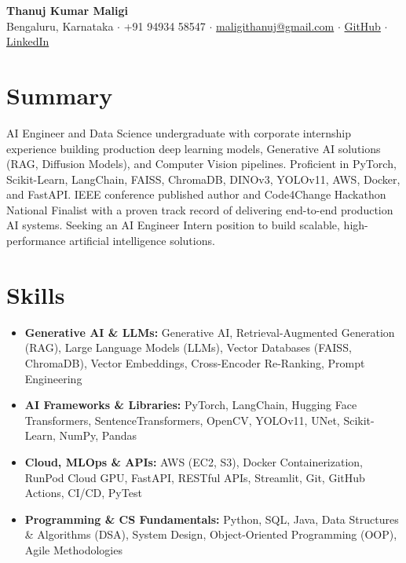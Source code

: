 \documentclass[a4paper,10pt]{article}
\begin{document}

\begin{center}
{\LARGE \textbf{Thanuj Kumar Maligi}}\\[1pt]
Bengaluru, Karnataka $\cdot$ +91 94934 58547 $\cdot$ \href{mailto:maligithanuj@gmail.com}{maligithanuj@gmail.com} $\cdot$ \href{https://github.com/ThanujMaligi}{GitHub} $\cdot$ \href{https://www.linkedin.com/in/thanuj-kumar-maligi-8882b2288}{LinkedIn}
\end{center}


\section*{Summary}
AI Engineer and Data Science undergraduate with corporate internship experience building production deep learning models, Generative AI solutions (RAG, Diffusion Models), and Computer Vision pipelines. Proficient in PyTorch, Scikit-Learn, LangChain, FAISS, ChromaDB, DINOv3, YOLOv11, AWS, Docker, and FastAPI. IEEE conference published author and Code4Change Hackathon National Finalist with a proven track record of delivering end-to-end production AI systems. Seeking an AI Engineer Intern position to build scalable, high-performance artificial intelligence solutions.


\section*{Skills}
\begin{itemize}[leftmargin=*,noitemsep,topsep=1pt,parsep=0pt,partopsep=0pt]
\item \textbf{Generative AI \& LLMs:} Generative AI, Retrieval-Augmented Generation (RAG), Large Language Models (LLMs), Vector Databases (FAISS, ChromaDB), Vector Embeddings, Cross-Encoder Re-Ranking, Prompt Engineering
\item \textbf{AI Frameworks \& Libraries:} PyTorch, LangChain, Hugging Face Transformers, SentenceTransformers, OpenCV, YOLOv11, UNet, Scikit-Learn, NumPy, Pandas
\item \textbf{Cloud, MLOps \& APIs:} AWS (EC2, S3), Docker Containerization, RunPod Cloud GPU, FastAPI, RESTful APIs, Streamlit, Git, GitHub Actions, CI/CD, PyTest
\item \textbf{Programming \& CS Fundamentals:} Python, SQL, Java, Data Structures \& Algorithms (DSA), System Design, Object-Oriented Programming (OOP), Agile Methodologies
\end{itemize}
\end{document}

